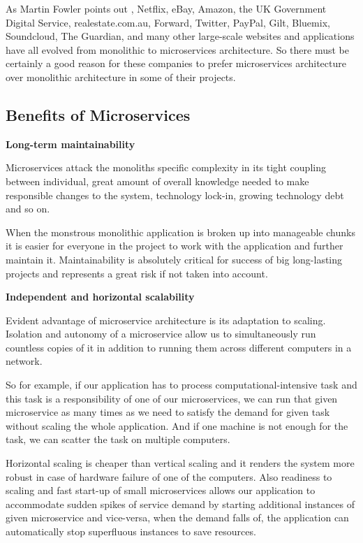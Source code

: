 \documentclass[12pt,oneside]{fithesis2}
\begin{document}
As Martin Fowler points out \cite{mf}, Netflix, eBay, Amazon, the UK Government Digital Service, realestate.com.au, Forward, Twitter, PayPal, Gilt, Bluemix, Soundcloud, The Guardian, and many other large-scale websites and applications have all evolved from monolithic to microservices architecture. So there must be certainly a good reason for these companies to prefer microservices architecture over monolithic architecture in some of their projects.\newpage

\subsection{Benefits of Microservices}
\bigskip

\noindent\textbf{Long-term maintainability}
\bigskip

Microservices attack the monoliths specific complexity in its tight coupling between individual, great amount of overall knowledge needed to make responsible changes to the system, technology lock-in, growing technology debt and so on.

When the monstrous monolithic application is broken up into manageable chunks it is easier for everyone in the project to work with the application and further maintain it. Maintainability is absolutely critical for success of big long-lasting projects and represents a great risk if not taken into account.
\bigskip

\noindent\textbf{Independent and horizontal scalability}
\bigskip

Evident advantage of microservice architecture is its adaptation to scaling. Isolation and autonomy of a microservice allow us to simultaneously run countless copies of it in addition to running them across different computers in a network.

So for example, if our application has to process computational-intensive task and this task is a responsibility of one of our microservices, we can run that given microservice as many times as we need to satisfy the demand for given task without scaling the whole application. And if one machine is not enough for the task, we can scatter the task on multiple computers.

Horizontal scaling is cheaper than vertical scaling and it renders the system more robust in case of hardware failure of one of the computers. Also readiness to scaling and fast start-up of small microservices allows our application to accommodate sudden spikes of service demand by starting additional instances of given microservice and vice-versa, when the demand falls of, the application can automatically stop superfluous instances to save resources.
\bigskip
\end{document}
